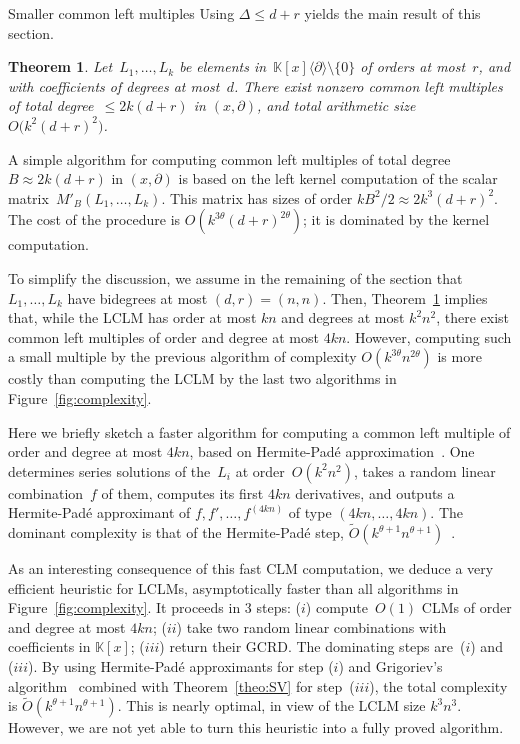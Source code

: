 \documentclass{sig-alt-full}
\def\K {\ensuremath{\mathbb{K}}}
\newcommand{\x}{x}
\newcommand{\Dx}{\partial}
\newcommand{\bigOsoft}{\widetilde{{O}}}
\newtheorem{theorem}{Theorem}
\begin{document}
\begin{section}{\!\!\!\! Smaller common left multiples}
\smallskip Using  $\Delta \leq d+r$ yields the main result of this section.

\vspace{-0.3cm}
\begin{theorem} \label{th:CLM}
Let~$L_1, \ldots, L_k$ be elements in~$\K[\x]\langle \Dx\rangle \setminus \{
0\}$ of orders at most~$r$, and with coefficients of degrees at most~$d$.
There exist nonzero common left multiples of total degree~$\leq 2k(d+r)$ in
$(x,\partial)$, and total arithmetic size $O\bigl(k^2 (d+r)^2\bigr)$.
\end{theorem}

\vspace{-0.3cm}
\medskip {} A simple algorithm for computing  common left multiples of total degree~$B\approx 2k(d+r)$ in $(x,\partial)$ is  based on the left kernel
computation of the scalar matrix~$M'_{B}(L_1,\dots,L_k)$. This matrix has sizes of order $k
B^2/2 \approx 2k^3(d+r)^2$. The cost of the procedure is $O(k^{3\theta} (d+r)^{2\theta})$; it is dominated by the kernel computation.

\smallskip To simplify the discussion, we assume in the remaining of the
section that $L_1,\ldots,L_k$ have bidegrees at most $(d,r)=(n,n)$. 
Then, Theorem~\ref{th:CLM} implies that, while the LCLM has
order at most $kn$ and degrees at most $k^2n^2$, there exist common left
multiples of order and degree at most $4kn$.
However, computing such a small multiple by the previous algorithm of
complexity $O(k^{3\theta} n^{2\theta})$ is more costly than computing the
LCLM by the last two algorithms in Figure~\ref{fig:complexity}. 

Here we briefly sketch a faster algorithm for computing a common left multiple
of order and degree at most $4kn$, based on Hermite-Pad\'e
approximation~\cite[Chapter~10]{Bostan03}. One determines series
solutions of the~$L_i$ at order~$O(k^2 n^2)$, takes a random linear
combination~$f$ of them, computes its first $4kn$ derivatives, and outputs a
Hermite-Padé approximant of $f, f', \ldots, f^{(4kn)}$ of type $(4kn, \ldots,
4kn)$. The dominant complexity is that of the Hermite-Padé step,
$\bigOsoft(k^{\theta+1} n^{\theta+1})$~\cite{Storjohann06}.

\medskip {} 
As an interesting consequence of this fast CLM computation, we
deduce a very efficient heuristic for LCLMs, asymptotically
faster than all algorithms in Figure~\ref{fig:complexity}. It proceeds in 3 steps:
($i$) compute~$O(1)$ CLMs of order and degree at most $4kn$;
($ii$) take two random linear combinations with coefficients in $\K[x]$; ($iii$)
return their GCRD. The dominating steps are~($i$) and ($iii$). By using
Hermite-Padé approximants for step ($i$) and Grigoriev's
algorithm~\cite{Grigoriev90} combined with Theorem~\ref{theo:SV} for step~($iii$), the total complexity is
$\bigOsoft(k^{\theta+1} n^{\theta+1})$. This is nearly optimal, in view of
the LCLM size $k^3 n^3$. 
However, we are not yet able to turn this heuristic into a fully proved algorithm.

\end{section}
\end{document}
